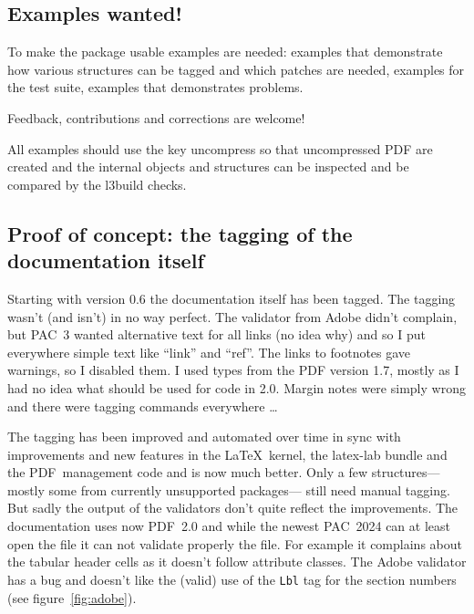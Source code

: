 \documentclass[bibliography=totoc,a4paper]{article}
\newcommand\PrintKeyName[1]{\textsf{#1}}
\newcommand\PDF{PDF}
\begin{document}
\subsection{Examples wanted!}

To make the package usable examples are needed: examples that demonstrate how 
various structures can be tagged and which patches are needed, examples for 
the test suite, examples that demonstrates problems. 


\begin{tcolorbox}
Feedback, contributions and corrections are welcome!
\end{tcolorbox}


All examples should use the  key \PrintKeyName{uncompress}
so that uncompressed \PDF{} are created and the internal objects and 
structures can be inspected and be compared by the l3build checks.%



\subsection{Proof of concept: the tagging of the documentation itself}

Starting with version 0.6 the documentation itself has been tagged. The 
tagging wasn't (and isn't) in no way perfect. The validator from Adobe didn't 
complain, but PAC~3 wanted alternative text for all links (no idea why) and 
so I put everywhere simple text like \enquote{link} and \enquote{ref}. The 
links to footnotes gave warnings, so I disabled them. I used types from the 
\PDF{} version 1.7, mostly as I had no idea what should be used for code in 
2.0. Margin notes were simply wrong and there were tagging commands 
everywhere \ldots 

The tagging has been improved and automated over time in sync with 
improvements and new features in the \LaTeX\ kernel, the latex-lab bundle and 
the \PDF\ management code and is now much better. Only a few 
structures---mostly some from currently unsupported packages--- still need 
manual tagging. But sadly the output of the validators don't quite reflect 
the improvements. The documentation uses now \PDF~2.0  and while the newest 
PAC~2024 can at least open the file it can not validate properly the file. For example
it complains about the tabular header cells as it doesn't follow attribute classes.
The Adobe validator has a bug and 
doesn't like the (valid) use of  the \texttt{Lbl} tag for the section numbers 
(see figure~\ref{fig:adobe}).  
\end{document}
